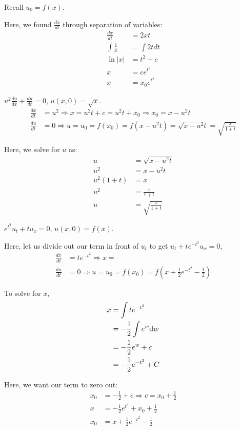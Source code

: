 \documentclass{article}
\begin{document}
Recall $u_0 = f(x)$.

Here, we found $\frac{dx}{dt}$ through separation of variables:
%
\begin{align}
  \frac{dx}{dt} & = 2xt\\
  \int \frac{1}{x} & = \int 2t dt\\
  \ln |x| & = t^2 + c\\
  x & = ce^{t^2}\\
  x & = x_0 e^{t^2}
\end{align}

\ex $u^2 \frac{du}{dx} + \frac{du}{dt} = 0$, $u(x, 0) = \sqrt x$.
%
\begin{align}
  \frac{dx}{dt} & = u^2 \Rightarrow x = u^2 t + c = u^2 t + x_0
  \Rightarrow x_0 = x - u^2 t\\
  \frac{du}{dt} & = 0 \Rightarrow u = u_0 = f(x_0) = f(x - u^2 t)
  = \sqrt{x - u^2 t} = \sqrt{\frac{x}{1 + t}}
\end{align}

Here, we solve for $u$ as:
%
\begin{align}
  u & = \sqrt{x - u^2 t}\\
  u^2 & = x - u^2 t\\
  u^2(1 + t) & = x\\
  u^2 & = \frac{x}{1 + t}\\
  u & = \sqrt{\frac{x}{1 + t}}
\end{align}

\ex $e^{t^2} u_t + tu_x = 0$, $u(x, 0) = f(x)$.

Here, let us divide out our term in front of
$u_t$ to get $u_t + te^{-t^2}u_x = 0$,
%
\begin{align}
  \frac{dx}{dt} & = te^{-t^2} \Rightarrow x = \\
  \frac{du}{dt} & = 0 \Rightarrow u = u_0 = f(x_0)
  = f(x + \frac{1}{2}e^{-t^2} - \frac{1}{2})
\end{align}

To solve for $x$,
%
\begin{align}
  x & = \int te^{-t^2}\\
  & = -\frac{1}{2} \int e^w \text dw\\
  & = -\frac{1}{2} e^w + c\\
  & = -\frac{1}{2} e^{-t^2} + C
\end{align}

Here, we want our term to zero out:
%
\begin{align}
  x_0 & = - \frac{1}{2} + c \Rightarrow c = x_0 + \frac{1}{2}\\
  x & = -\frac{1}{2} e^{t^2} + x_0 + \frac{1}{2}\\
  x_0 & = x + \frac{1}{2} e^{-t^2} - \frac{1}{2}
\end{align}
\end{document}
